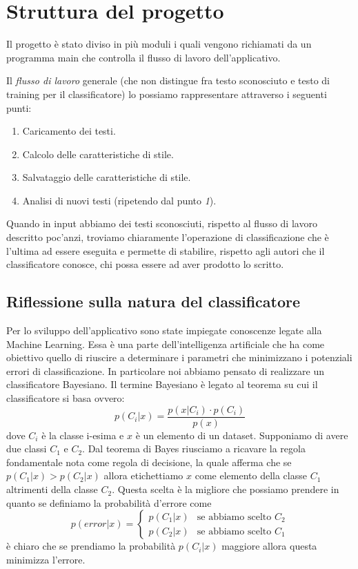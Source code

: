 \documentclass[titlepage]{article}
\begin{document}
\newpage
\section{Struttura del progetto}
\label{sec:3}
Il progetto è stato diviso in più moduli i quali vengono richiamati da un programma main che controlla il flusso di lavoro dell'applicativo.

Il \textit{flusso di lavoro} generale (che non distingue fra testo sconosciuto e testo di training per il classificatore) lo possiamo rappresentare attraverso i seguenti punti:
\begin{enumerate}
    \item Caricamento dei testi.
    \item Calcolo delle caratteristiche di stile.
    \item Salvataggio delle caratteristiche di stile.
    \item Analisi di nuovi testi (ripetendo dal punto \emph{1}).
\end{enumerate}
Quando in input abbiamo dei testi sconosciuti, rispetto al flusso di lavoro descritto poc'anzi, troviamo chiaramente l'operazione di classificazione che è l'ultima ad essere eseguita e permette di stabilire, rispetto agli autori che il classificatore conosce, chi possa essere ad aver prodotto lo scritto.

\subsection{Riflessione sulla natura del classificatore}
\label{sec:3.1}
Per lo sviluppo dell'applicativo sono state impiegate conoscenze legate alla Machine Learning. Essa è una parte dell'intelligenza artificiale che ha come obiettivo quello di riuscire a determinare i parametri che minimizzano i potenziali errori di classificazione. In particolare noi abbiamo pensato di realizzare un classificatore Bayesiano. Il termine Bayesiano è legato al teorema su cui il classificatore si basa ovvero:
\begin{equation}
    p(C_i | x) = \frac{p(x | C_i) \cdot p(C_i)}{p(x)}
\end{equation}
dove $C_i$ è la classe i-esima e $x$ è un elemento di un dataset. Supponiamo di avere due classi $C_1$ e $C_2$. Dal teorema di Bayes riusciamo a ricavare la regola fondamentale nota come regola di decisione, la quale afferma che se $p(C_1 | x) > p(C_2 | x)$ allora etichettiamo $x$ come elemento della classe $C_1$ altrimenti della classe $C_2$. Questa scelta è la migliore che possiamo prendere in quanto se definiamo la probabilità d'errore come
\begin{equation}
    p(error | x) = \begin{cases}
    p(C_1 | x) & \text{se abbiamo scelto $C_2$} \\
    p(C_2 | x) & \text{se abbiamo scelto $C_1$}
    \end{cases}
\end{equation}
è chiaro che se prendiamo la probabilità $p(C_i | x)$ maggiore allora questa minimizza l'errore. 
\end{document}
